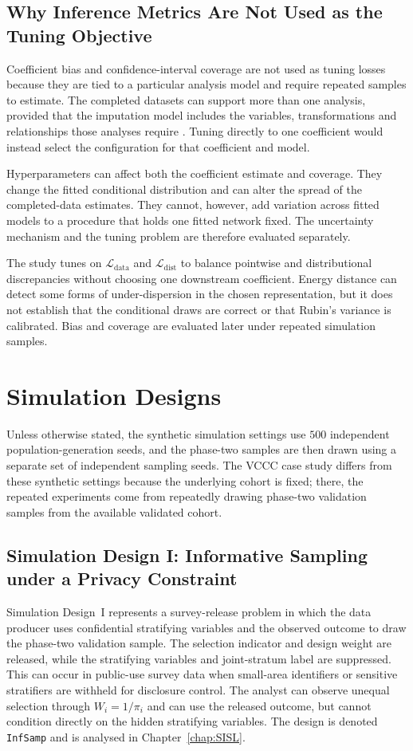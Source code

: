 \subsection{Why Inference Metrics Are Not Used as the Tuning Objective}

Coefficient bias and confidence-interval coverage are not used as tuning losses because they are tied to a particular analysis model and require repeated samples to estimate. The completed datasets can support more than one analysis, provided that the imputation model includes the variables, transformations and relationships those analyses require \citep{Rubin1987, meng1994multiple}. Tuning directly to one coefficient would instead select the configuration for that coefficient and model.

Hyperparameters can affect both the coefficient estimate and coverage. They change the fitted conditional distribution and can alter the spread of the completed-data estimates. They cannot, however, add variation across fitted models to a procedure that holds one fitted network fixed. The uncertainty mechanism and the tuning problem are therefore evaluated separately.

The study tunes on $\mathcal{L}_{\mathrm{data}}$ and $\mathcal{L}_{\mathrm{dist}}$ to balance pointwise and distributional discrepancies without choosing one downstream coefficient. Energy distance can detect some forms of under-dispersion in the chosen representation, but it does not establish that the conditional draws are correct or that Rubin's variance is calibrated. Bias and coverage are evaluated later under repeated simulation samples.

\section{Simulation Designs}
\label{sec:simcontext}
Unless otherwise stated, the synthetic simulation settings use $500$ independent population-generation seeds, and the phase-two samples are then drawn using a separate set of independent sampling seeds. The VCCC case study differs from these synthetic settings because the underlying cohort is fixed; there, the repeated experiments come from repeatedly drawing phase-two validation samples from the available validated cohort.

\subsection{Simulation Design I: Informative Sampling under a Privacy Constraint}
\label{sec:infsamp_context}
Simulation Design~I represents a survey-release problem in which the data producer uses confidential stratifying variables and the observed outcome to draw the phase-two validation sample. The selection indicator and design weight are released, while the stratifying variables and joint-stratum label are suppressed. This can occur in public-use survey data when small-area identifiers or sensitive stratifiers are withheld for disclosure control. The analyst can observe unequal selection through $W_i = 1/\pi_i$ and can use the released outcome, but cannot condition directly on the hidden stratifying variables. The design is denoted \texttt{InfSamp} and is analysed in Chapter~\ref{chap:SISL}.

